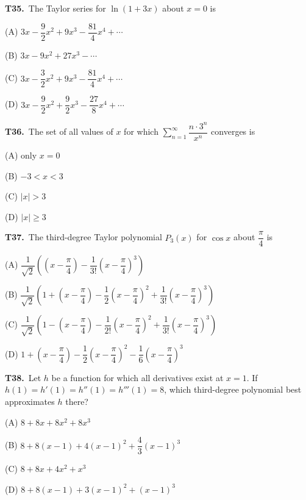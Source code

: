 \documentclass[11pt]{article}
\begin{document}
\bigskip\noindent\textbf{T35.}\ The Taylor series for $\ln(1+3x)$ about $x=0$ is
\begin{list}{}{\setlength{\leftmargin}{3em}\setlength{\labelwidth}{2.5em}\setlength{\itemsep}{0pt}\setlength{\topsep}{2pt}}
\item[(A)] $3x-\dfrac{9}{2}x^2+9x^3-\dfrac{81}{4}x^4+\cdots$
\item[(B)] $3x-9x^2+27x^3-\cdots$
\item[(C)] $3x-\dfrac{3}{2}x^2+9x^3-\dfrac{81}{4}x^4+\cdots$
\item[(D)] $3x-\dfrac{9}{2}x^2+\dfrac{9}{2}x^3-\dfrac{27}{8}x^4+\cdots$
\end{list}

\bigskip\noindent\textbf{T36.}\ The set of all values of $x$ for which $\displaystyle\sum_{n=1}^\infty \dfrac{n\cdot 3^n}{x^n}$ converges is
\begin{list}{}{\setlength{\leftmargin}{3em}\setlength{\labelwidth}{2.5em}\setlength{\itemsep}{0pt}\setlength{\topsep}{2pt}}
\item[(A)] only $x=0$
\item[(B)] $-3<x<3$
\item[(C)] $|x|>3$
\item[(D)] $|x|\geq 3$
\end{list}

\bigskip\noindent\textbf{T37.}\ The third-degree Taylor polynomial $P_3(x)$ for $\cos x$ about $\dfrac{\pi}{4}$ is
\begin{list}{}{\setlength{\leftmargin}{3em}\setlength{\labelwidth}{2.5em}\setlength{\itemsep}{0pt}\setlength{\topsep}{2pt}}
\item[(A)] $\dfrac{1}{\sqrt{2}}\left(\left(x-\dfrac{\pi}{4}\right)-\dfrac{1}{3!}\left(x-\dfrac{\pi}{4}\right)^3\right)$
\item[(B)] $\dfrac{1}{\sqrt{2}}\left(1+\left(x-\dfrac{\pi}{4}\right)-\dfrac{1}{2}\left(x-\dfrac{\pi}{4}\right)^2+\dfrac{1}{3!}\left(x-\dfrac{\pi}{4}\right)^3\right)$
\item[(C)] $\dfrac{1}{\sqrt{2}}\left(1-\left(x-\dfrac{\pi}{4}\right)-\dfrac{1}{2!}\left(x-\dfrac{\pi}{4}\right)^2+\dfrac{1}{3!}\left(x-\dfrac{\pi}{4}\right)^3\right)$
\item[(D)] $1+\left(x-\dfrac{\pi}{4}\right)-\dfrac{1}{2}\left(x-\dfrac{\pi}{4}\right)^2-\dfrac{1}{6}\left(x-\dfrac{\pi}{4}\right)^3$
\end{list}

\bigskip\noindent\textbf{T38.}\ Let $h$ be a function for which all derivatives exist at $x=1$. If $h(1)=h'(1)=h''(1)=h'''(1)=8$, which third-degree polynomial best approximates $h$ there?
\begin{list}{}{\setlength{\leftmargin}{3em}\setlength{\labelwidth}{2.5em}\setlength{\itemsep}{0pt}\setlength{\topsep}{2pt}}
\item[(A)] $8+8x+8x^2+8x^3$
\item[(B)] $8+8(x-1)+4(x-1)^2+\dfrac{4}{3}(x-1)^3$
\item[(C)] $8+8x+4x^2+x^3$
\item[(D)] $8+8(x-1)+3(x-1)^2+(x-1)^3$
\end{list}
\end{document}
